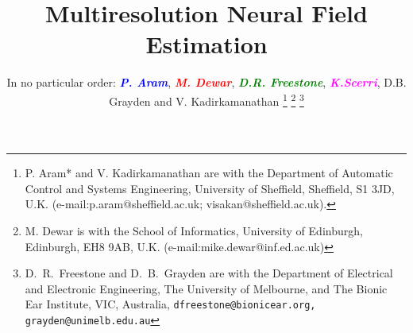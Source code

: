 \documentclass[journal,a4paper]{IEEEtran}
\newcommand{\mike}[1]{\textsf{\emph{\textbf{\textcolor{red}{#1}}}}}
\newcommand{\dean}[1]{\textsf{\emph{\textbf{\textcolor{green}{#1}}}}}
\newcommand{\parham}[1]{\textsf{\emph{\textbf{\textcolor{blue}{#1}}}}}
\newcommand{\ken}[1]{\textsf{\emph{\textbf{\textcolor{magenta}{#1}}}}}
\begin{document}
%
\title{Multiresolution Neural Field Estimation }
%
%
%

\author{In no particular order: \parham{P. Aram}, \mike{M. Dewar}, \dean{D.R. Freestone}, \ken{K.Scerri}, D.B. Grayden and V. Kadirkamanathan %
\thanks{P. Aram* and V. Kadirkamanathan are with the Department of Automatic Control and Systems Engineering, University of Sheffield, Sheffield, S1 3JD, U.K. (e-mail:p.aram@sheffield.ac.uk; visakan@sheffield.ac.uk).}%
\thanks{M. Dewar is with the School of Informatics, University of Edinburgh, Edinburgh, EH8 9AB, U.K. (e-mail:mike.dewar@inf.ed.ac.uk)}
\thanks{D.\ R.\ Freestone and D.\ B.\ Grayden are with the Department
of Electrical and Electronic Engineering, The University of Melbourne, and The Bionic Ear Institute, VIC, Australia,  {\tt\small dfreestone@bionicear.org, grayden@unimelb.edu.au}}}%

% 
%
\end{document}
